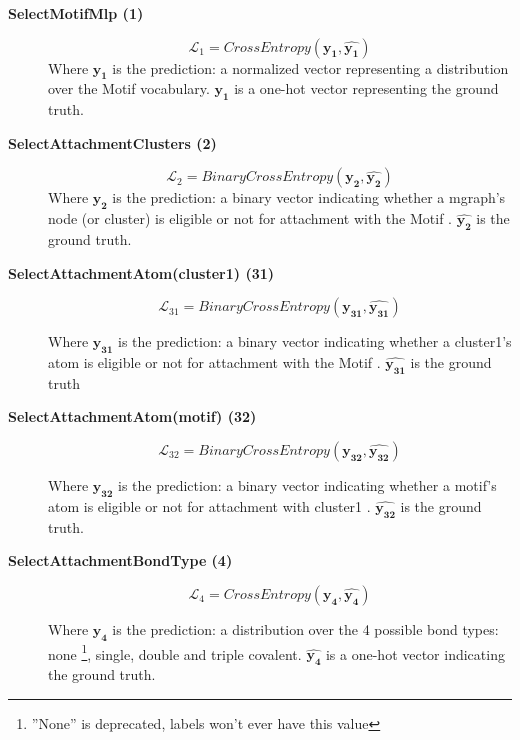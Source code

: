 \documentclass{article}
\begin{document}
\begin{description}
\item[\textbf{SelectMotifMlp (1)}]
\begin{equation}
    \mathcal{L}_1 = CrossEntropy(\boldsymbol{y_1}, \boldsymbol{\hat{y_1}})
\end{equation}
Where $\boldsymbol{y_1}$ is the prediction: a normalized vector representing a distribution over the Motif vocabulary.
$\boldsymbol{\hat{y_1}}$ is a one-hot vector representing the ground truth.

\item[\textbf{SelectAttachmentClusters (2)}]
\begin{equation}
    \mathcal{L}_2 = BinaryCrossEntropy(\boldsymbol{y_2}, \boldsymbol{\hat{y_2}})
\end{equation}
Where $\boldsymbol{y_2}$ is the prediction: a binary vector indicating whether a mgraph's node (or cluster) is eligible or not for attachment with the Motif \footnotemark[\value{footnote}].
$\boldsymbol{\hat{y_2}}$ is the ground truth.

\item[\textbf{SelectAttachmentAtom(cluster1) (31)}]
\begin{equation}
    \mathcal{L}_{31} = BinaryCrossEntropy(\boldsymbol{y_{31}}, \boldsymbol{\hat{y_{31}}})
\end{equation}

Where $\boldsymbol{y_{31}}$ is the prediction: a binary vector indicating whether a cluster1's atom is eligible or not for attachment with the Motif \footnotemark[\value{footnote}].
$\boldsymbol{\hat{y_{31}}}$ is the ground truth


\item[\textbf{SelectAttachmentAtom(motif) (32)}]
\begin{equation}
    \mathcal{L}_{32} = BinaryCrossEntropy(\boldsymbol{y_{32}}, \boldsymbol{\hat{y_{32}}})
\end{equation}

Where $\boldsymbol{y_{32}}$ is the prediction: a binary vector indicating whether a motif's atom is eligible or not for attachment with cluster1 \footnotemark{\value{footnote}}.
$\boldsymbol{\hat{y_{32}}}$ is the ground truth.


\item[\textbf{SelectAttachmentBondType (4)}]
\begin{equation}
    \mathcal{L}_4 = CrossEntropy(\boldsymbol{y_4}, \boldsymbol{\hat{y_4}})
\end{equation}

Where $\boldsymbol{y_{4}}$ is the prediction: a distribution over the 4 possible bond types: none \footnote{''None'' is deprecated, labels won't ever have this value}, single, double and triple covalent.
$\boldsymbol{\hat{y_{4}}}$ is a one-hot vector indicating the ground truth.

\end{description}
\end{document}
